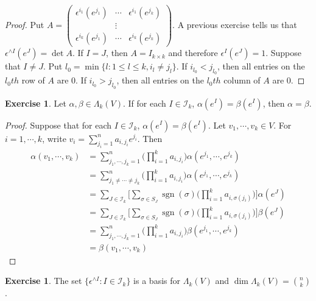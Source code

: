 \documentclass[12pt]{amsart}
\theoremstyle{definition}
\newtheorem{ex}[definition]{Exercise}
\newcommand{\al}{\alpha}
\newcommand{\bet}{\beta}
\newcommand{\Lam}{\Lambda}
\newcommand{\ep}{\epsilon}
\newcommand{\sig}{\sigma}
\newcommand{\MI}{\mathcal{I}}
\DeclareMathOperator{\sgn}{sgn}
\begin{document}
	\begin{proof}
		Put $A = \begin{pmatrix}
			\ep^{i_1}(e^{j_1}) & \cdots & \ep^{i_1}(e^{j_k}) \\
			& \vdots & \\
			\ep^{i_k}(e^{j_1}) & \cdots & \ep^{i_k}(e^{j_k}) 
		\end{pmatrix}$.
		A previous exercise tells us that $\ep^{\wedge I} (e^J) = \det A$.
		If $I = J$, then $A = I_{k\times k}$ and therefore $\ep^I(e^J) = 1$. Suppose that $I \neq J$. Put $l_0 = \min \{l: 1 \leq l \leq k, i_l \neq j_l\}$. If $i_{l_0} < j_{l_0}$, then all entries on the $l_0th$ row of $A$ are $0$. If $i_{l_0} > j_{l_0}$, then all entries on the $l_0th$ column of $A$ are $0$.
	\end{proof}

	\begin{ex}
		Let $\al , \bet \in \Lam_k(V)$. If for each $I \in \MI_k$, $\al(e^I) = \bet(e^I)$, then $\al = \bet$.
	\end{ex}

	\begin{proof}
		Suppose that for each $I \in \MI_k$, $\al(e^I) = \bet(e^I)$. Let $v_1, \cdots, v_k \in V$. For $i = 1, \cdots, k$, write $v_i = \sum_{j_i = 1}^n a_{i,j_i}e^{j_i}$. Then 
		\begin{align*}
			\al(v_1, \cdots, v_k) 
			&= \sum_{j_1, \cdots, j_k =1}^n \bigg( \prod_{i=1}^k a_{i, j_i} \bigg) \al(e^{j_1}, \cdots, e^{j_k}) \\
			&= \sum_{j_1 \neq \cdots \neq j_k}^n \bigg( \prod_{i=1}^k a_{i, j_i} \bigg) \al(e^{j_1}, \cdots, e^{j_k}) \\
			&= \sum_{J \in \MI_k} \bigg [ \sum_{\sig \in S_J} \sgn(\sig) \bigg( \prod_{i=1}^k a_{i, \sig(j_i)} \bigg) \bigg] \al(e^J) \\
			&= \sum_{J \in \MI_k} \bigg [ \sum_{\sig \in S_J} \sgn(\sig) \bigg( \prod_{i=1}^k a_{i, \sig(j_i)} \bigg) \bigg] \bet(e^J) \\
			&= \sum_{j_1, \cdots, j_k =1}^n \bigg( \prod_{i=1}^k a_{i, j_i} \bigg) \bet(e^{j_1}, \cdots, e^{j_k}) \\
			&= \bet(v_1, \cdots, v_k) 
		\end{align*}
	
	\end{proof}

	\begin{ex}
		The set $\{\ep^{\wedge I} : I \in \MI_k\}$ is a basis for $\Lam_k(V)$ and $\dim \Lam_k(V) = {n \choose k}$.
	\end{ex}
\end{document}
